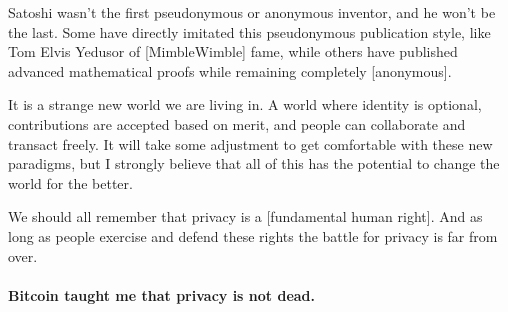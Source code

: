 Satoshi wasn't the first pseudonymous or anonymous inventor, and he
won't be the last. Some have directly imitated this pseudonymous
publication style, like Tom Elvis Yedusor of [MimbleWimble] fame, while
others have published advanced mathematical proofs while remaining
completely [anonymous].

It is a strange new world we are living in. A world where identity is
optional, contributions are accepted based on merit, and people can
collaborate and transact freely. It will take some adjustment to get
comfortable with these new paradigms, but I strongly believe that all of
this has the potential to change the world for the better.

We should all remember that privacy is a [fundamental human right]. And as long
as people exercise and defend these rights the battle for privacy is far from
over.

\paragraph{Bitcoin taught me that privacy is not dead.}

%
%
%
%
